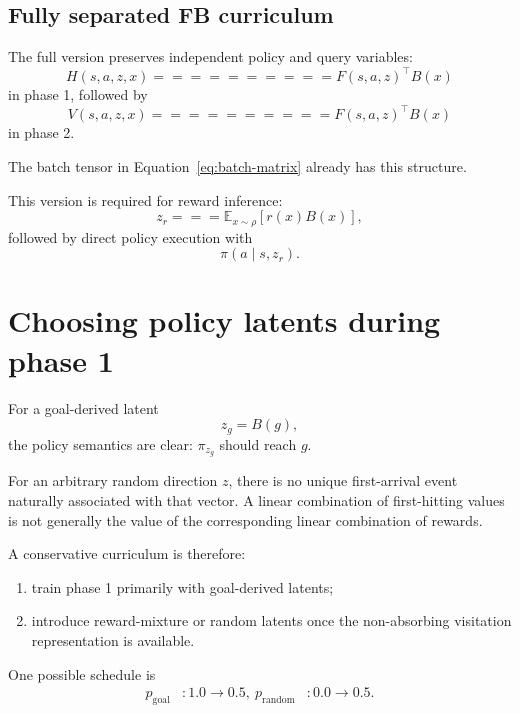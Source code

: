 \documentclass[10pt]{article}
\newcommand{\E}{\mathbb{E}}
\begin{document}
\subsection{Fully separated FB curriculum}

The full version preserves independent policy and query variables:
\begin{equation}
H(s,a,z,x)
==========

F(s,a,z)^\top B(x)
\end{equation}
in phase 1, followed by
\begin{equation}
V(s,a,z,x)
==========

F(s,a,z)^\top B(x)
\end{equation}
in phase 2.

The batch tensor in Equation~\eqref{eq:batch-matrix} already has this structure.

This version is required for reward inference:
\begin{equation}
z_r
===

\E_{x\sim\rho}
\left[
r(x)B(x)
\right],
\end{equation}
followed by direct policy execution with
\begin{equation}
\pi(a\mid s,z_r).
\end{equation}

\section{Choosing policy latents during phase 1}

For a goal-derived latent
\begin{equation}
z_g=B(g),
\end{equation}
the policy semantics are clear:
$\pi_{z_g}$ should reach $g$.

For an arbitrary random direction $z$, there is no unique first-arrival event naturally
associated with that vector.
A linear combination of first-hitting values is not generally the value of the
corresponding linear combination of rewards.

A conservative curriculum is therefore:
\begin{enumerate}
\item train phase 1 primarily with goal-derived latents;
\item introduce reward-mixture or random latents once the non-absorbing visitation
representation is available.
\end{enumerate}

One possible schedule is
\begin{align}
p_{\mathrm{goal}}
&:
1.0\longrightarrow0.5,
\
p_{\mathrm{random}}
&:
0.0\longrightarrow0.5.
\end{align}
\end{document}
